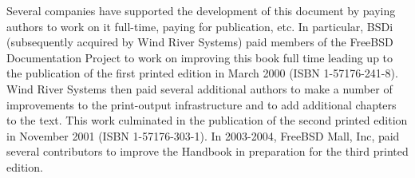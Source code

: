 Several companies have supported the development of this document by paying
authors to work on it full-time, paying for publication, etc.
In particular, BSDi (subsequently acquired by Wind River Systems) paid members
of the FreeBSD Documentation Project to work on improving this book full time
leading up to the publication of the first printed edition in March 2000
(ISBN 1-57176-241-8).
Wind River Systems then paid several additional authors to make a number of
improvements to the print-output infrastructure and to add additional chapters
to the text.
This work culminated in the publication of the second printed edition in
November 2001 (ISBN 1-57176-303-1).
In 2003-2004, FreeBSD Mall, Inc, paid several contributors to improve the
Handbook in preparation for the third printed edition.